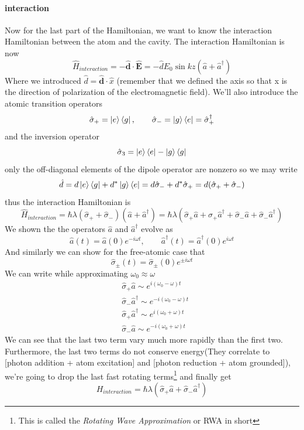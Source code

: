 \documentclass[english, a4paper, 12pt, twoside]{article}
\numberwithin{equation}{section} %
\begin{document}
\paragraph*{interaction}

Now for the last part of the Hamiltonian, we want to know the interaction Hamiltonian between the atom and the cavity. The interaction Hamiltonian is now 
\[
\hat{H}_{interaction} = -\hat{\textbf{d}}\cdot\hat{\textbf{E}} = -\hat{d} E_0 \sin{kz} (\hat{a} + \hat{a}^\dag{})
\]
Where we introduced $\hat{d} = \hat{\textbf{d}} \cdot \hat{x}$ (remember that we defined the axis so that x is the direction of polarization of the electromagnetic field).
We'll also introduce the atomic transition operators
\[
    \hat{\sigma}_+ = \ket{e}\bra{g}, \quad\quad \hat{\sigma}_- = \ket{g}\bra{e} = \hat{\sigma}_+^{\dag{}}
\]
and the inversion operator
\[
\hat{\sigma}_3 = \ket{e}\bra{e} - \ket{g}\bra{g}
\]
only the off-diagonal elements of the dipole operator are nonzero so we may write
\[
    \hat{d} = d\ket{e}\bra{g} + d^* \ket{g}\bra{e} = d\hat{\sigma}_- + d^* \hat{\sigma}_+ = d(\hat{\sigma}_+ + \hat{\sigma}_-)
\]
thus the interaction Hamiltonian is
\begin{equation}
    \hat{H}_{interaction} = \hbar\lambda(\hat{\sigma}_+ + \hat{\sigma}_-)(\hat{a} +  \hat{a}^\dag) 
    = \hbar\lambda(\hat{\sigma}_+\hat{a} + \hat{\sigma}_+\hat{a}^\dag + \hat{\sigma}_-\hat{a} + \hat{\sigma}_-\hat{a}^\dag) 
\end{equation} \label{eq:interaction-hamiltonian}
We shown the the operators $\hat{a}$ and $\hat{a}^\dag{}$ evolve as
\begin{equation}
    \hat{a}(t) = \hat{a}(0)e^{-i\omega t}, \quad\quad \hat{a}^\dag{}(t) = \hat{a}^\dag{}(0)e^{i\omega t}
\end{equation}
And similarly we can show for the free-atomic case that
\begin{equation}
    \hat{\sigma}_{\pm}(t) =   \hat{\sigma}_{\pm}(0)e^{\pm i\omega t}
\end{equation}
We can write while approximating $\omega_0 \approx \omega$
\begin{equation}
    \begin{split}
        &\hat{\sigma}_+\hat{a} \sim e^{i(\omega_0 - \omega)t}\\
        &\hat{\sigma}_-\hat{a}^\dag \sim e^{-i(\omega_0 - \omega)t}\\
        &\hat{\sigma}_+\hat{a}^\dag \sim e^{i(\omega_0 + \omega)t}\\
        &\hat{\sigma}_-\hat{a} \sim e^{-i(\omega_0 + \omega)t}
    \end{split}
\end{equation}
We can see that the last two term vary much more rapidly than the first two. Furthermore, the last two terms do not conserve energy(They correlate to [photon addition + atom excitation] and [photon reduction + atom grounded]), we're going to drop the last fast rotating terms\footnote{This is called the \textit{Rotating Wave Approximation} or RWA in short} and finally get
\begin{equation} \label{eq:interaction-hamiltonian-RWA}
    \boxed{H_{interaction} = \hbar\lambda(\hat{\sigma}_+\hat{a} + \hat{\sigma}_-\hat{a}^\dag)}
\end{equation}
\end{document}
